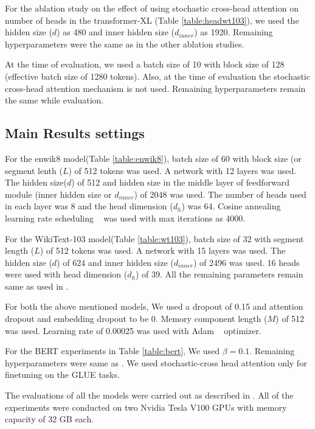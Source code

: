 \documentclass[11pt]{article}
\begin{document}
For the ablation study on the effect of using stochastic cross-head attention on number of heads in the transformer-XL (Table \ref{table:headwt103}), we used the hidden size ($d$) as 480 and inner hidden size ($d_{inner}$) as 1920. Remaining hyperparameters were the same as in the other ablation studies.




At the time of evaluation, we used a batch size of 10 with block size of 128 (effective batch size of 1280 tokens). Also, at the time of evaluation the stochastic cross-head attention mechanism is not used. Remaining hyperparameters remain the same while evaluation.

\subsection{Main Results settings}
For the enwik8 model(Table \ref{table:enwik8}), batch size of 60 with block size (or segment lenth ($L$) of 512 tokens  was used. A network with 12 layers was used. The hidden size($d$) of 512 and hidden size in the middle layer of feedforward module (inner hidden size or $d_{inner}$) of 2048 was used. The number of heads used in each layer was 8 and the head dimension ($d_h$) was 64. Cosine annealing learning rate scheduling ~\citep{DBLP:conf/iclr/LoshchilovH17} was used  with max iterations as 4000.



For the WikiText-103 model(Table \ref{table:wt103}), batch size of 32 with segment length ($L$) of 512 tokens was used. A network with 15 layers was used. The hidden size ($d$) of 624 and inner hidden size ($d_{inner}$) of 2496 was used.  16 heads were used with head dimension ($d_h$) of 39. All the remaining parameters remain same as used in . 

For both the above mentioned models, We used a dropout of 0.15 and attention dropout and embedding dropout to be 0. Memory component length ($M$) of 512 was used. Learning rate of 0.00025 was used with Adam ~\citep{DBLP:journals/corr/KingmaB14} optimizer.

For the BERT experiments in Table \ref{table:bert}, We used $\beta = 0.1$. Remaining hyperparameters were same as \citet{DBLP:conf/naacl/DevlinCLT19}. We used stochastic-cross head attention only for finetuning on the GLUE tasks. 




The evaluations of all the models were carried out as described in . All of the experiments were conducted on two Nvidia Tesla V100 GPUs with memory capacity of 32 GB each. 
\end{document}
